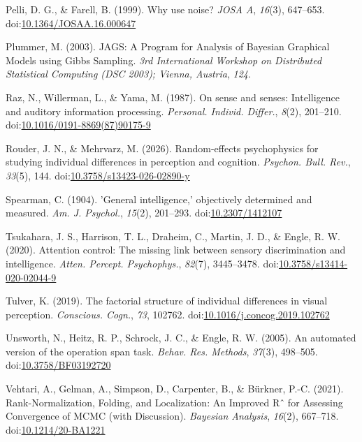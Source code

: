 \documentclass[
  ,man]{apa6}
\newlength{\cslhangindent}
\newenvironment{CSLReferences}[2] %
 {\begin{list}{}{%
  \setlength{\itemindent}{0pt}
  \setlength{\leftmargin}{0pt}
  \setlength{\parsep}{0pt}
  \ifodd #1
   \setlength{\leftmargin}{\cslhangindent}
   \setlength{\itemindent}{-1\cslhangindent}
  \fi
  \setlength{\itemsep}{#2\baselineskip}}}
 {\end{list}}
\begin{document}
\begin{CSLReferences}{1}{0}
Pelli, D. G., \& Farell, B. (1999). Why use noise? \emph{JOSA A}, \emph{16}(3), 647--653. doi:\href{https://doi.org/10.1364/JOSAA.16.000647}{10.1364/JOSAA.16.000647}

Plummer, M. (2003). {JAGS}: {A Program} for {Analysis} of {Bayesian Graphical Models} using {Gibbs Sampling}. \emph{3rd International Workshop on Distributed Statistical Computing (DSC 2003); Vienna, Austria}, \emph{124}.

Raz, N., Willerman, L., \& Yama, M. (1987). On sense and senses: {Intelligence} and auditory information processing. \emph{Personal. Individ. Differ.}, \emph{8}(2), 201--210. doi:\href{https://doi.org/10.1016/0191-8869(87)90175-9}{10.1016/0191-8869(87)90175-9}

Rouder, J. N., \& Mehrvarz, M. (2026). Random-effects psychophysics for studying individual differences in perception and cognition. \emph{Psychon. Bull. Rev.}, \emph{33}(5), 144. doi:\href{https://doi.org/10.3758/s13423-026-02890-y}{10.3758/s13423-026-02890-y}

Spearman, C. (1904). '{General} intelligence,' objectively determined and measured. \emph{Am. J. Psychol.}, \emph{15}(2), 201--293. doi:\href{https://doi.org/10.2307/1412107}{10.2307/1412107}

Tsukahara, J. S., Harrison, T. L., Draheim, C., Martin, J. D., \& Engle, R. W. (2020). Attention control: {The} missing link between sensory discrimination and intelligence. \emph{Atten. Percept. Psychophys.}, \emph{82}(7), 3445--3478. doi:\href{https://doi.org/10.3758/s13414-020-02044-9}{10.3758/s13414-020-02044-9}

Tulver, K. (2019). The factorial structure of individual differences in visual perception. \emph{Conscious. Cogn.}, \emph{73}, 102762. doi:\href{https://doi.org/10.1016/j.concog.2019.102762}{10.1016/j.concog.2019.102762}

Unsworth, N., Heitz, R. P., Schrock, J. C., \& Engle, R. W. (2005). An automated version of the operation span task. \emph{Behav. Res. Methods}, \emph{37}(3), 498--505. doi:\href{https://doi.org/10.3758/BF03192720}{10.3758/BF03192720}

Vehtari, A., Gelman, A., Simpson, D., Carpenter, B., \& Bürkner, P.-C. (2021). Rank-{Normalization}, {Folding}, and {Localization}: {An Improved Rˆ} for {Assessing Convergence} of {MCMC} (with {Discussion}). \emph{Bayesian Analysis}, \emph{16}(2), 667--718. doi:\href{https://doi.org/10.1214/20-BA1221}{10.1214/20-BA1221}


\end{CSLReferences}
\end{document}

